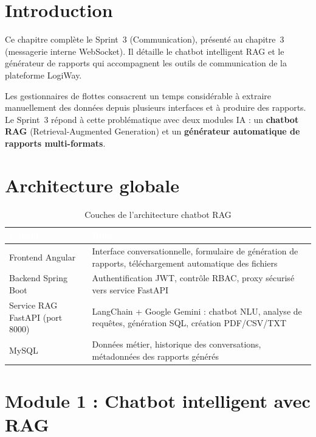 \documentclass[12pt,a4paper]{report}
\newcommand{\thead}[1]{\cellcolor{tablehead}\textcolor{white}{\textbf{#1}}}
\begin{document}
\section{Introduction}
\label{sec:ch7-introduction}

Ce chapitre complète le Sprint~3 (Communication), présenté au chapitre~3
(messagerie interne WebSocket). Il détaille le chatbot intelligent RAG et
le générateur de rapports qui accompagnent les outils de communication de
la plateforme LogiWay.

Les gestionnaires de flottes consacrent un temps considérable à extraire
manuellement des données depuis plusieurs interfaces et à produire des rapports.
Le Sprint~3 répond à cette problématique avec deux modules IA :
un \textbf{chatbot RAG} (Retrieval-Augmented Generation) et un
\textbf{générateur automatique de rapports multi-formats}.

\section{Architecture globale}
\label{sec:ch7-archi}

\begin{table}[H]
  \centering
  \caption{Couches de l'architecture chatbot RAG}
  \label{tab:archi_rag}
  \begin{tabularx}{\textwidth}{|l|Y|}
    \hline
    \thead{Couche} & \thead{Rôle} \\
    \hline
    Frontend Angular &
      Interface conversationnelle, formulaire de génération de rapports,
      téléchargement automatique des fichiers \\
    Backend Spring Boot &
      Authentification JWT, contrôle RBAC, proxy sécurisé
      vers service FastAPI \\
    Service RAG FastAPI (port 8000) &
      LangChain + Google Gemini : chatbot NLU,
      analyse de requêtes, génération SQL, création PDF/CSV/TXT \\
    MySQL &
      Données métier, historique des conversations,
      métadonnées des rapports générés \\
    \hline
  \end{tabularx}
\end{table}

\section{Module 1 : Chatbot intelligent avec RAG}
\label{sec:ch7-module1}
\end{document}
